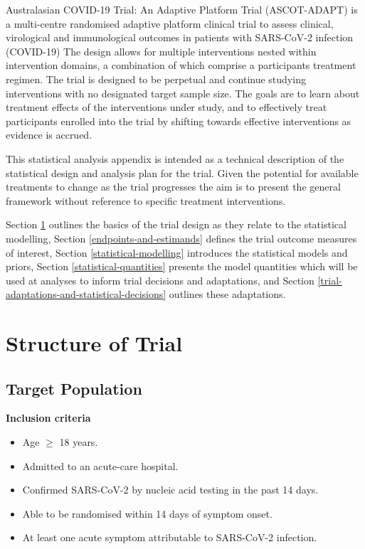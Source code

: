 \documentclass[
  11pt,
]{article}
\providecommand{\tightlist}{%
  \setlength{\itemsep}{0pt}\setlength{\parskip}{0pt}}
\begin{document}
Australasian COVID-19 Trial: An Adaptive Platform Trial (ASCOT-ADAPT) is a multi-centre randomised adaptive platform clinical trial to assess clinical, virological and immunological outcomes in patients with SARS-CoV-2 infection (COVID-19)
The design allows for multiple interventions nested within intervention domains, a combination of which comprise a participants treatment regimen.
The trial is designed to be perpetual and continue studying interventions with no designated target sample size.
The goals are to learn about treatment effects of the interventions under study, and to effectively treat participants enrolled into the trial by shifting towards effective interventions as evidence is accrued.

This statistical analysis appendix is intended as a technical description of the statistical design and analysis plan for the trial.
Given the potential for available treatments to change as the trial progresses the aim is to present the general framework without reference to specific treatment interventions.

Section \ref{structure-of-trial} outlines the basics of the trial design as they relate to the statistical modelling, Section \ref{endpoints-and-estimands} defines the trial outcome measures of interest, Section \ref{statistical-modelling} introduces the statistical models and priors, Section \ref{statistical-quantities} presents the model quantities which will be used at analyses to inform trial decisions and adaptations, and Section \ref{trial-adaptations-and-statistical-decisions} outlines these adaptations.

\hypertarget{structure-of-trial}{%
\section{Structure of Trial}\label{structure-of-trial}}

\hypertarget{target-population}{%
\subsection{Target Population}\label{target-population}}

\textbf{Inclusion criteria}

\begin{itemize}
\tightlist
\item
  Age \(\geq\) 18 years.
\item
  Admitted to an acute-care hospital.
\item
  Confirmed SARS-CoV-2 by nucleic acid testing in the past 14 days.
\item
  Able to be randomised within 14 days of symptom onset.
\item
  At least one acute symptom attributable to SARS-CoV-2 infection.
\end{itemize}
\end{document}
